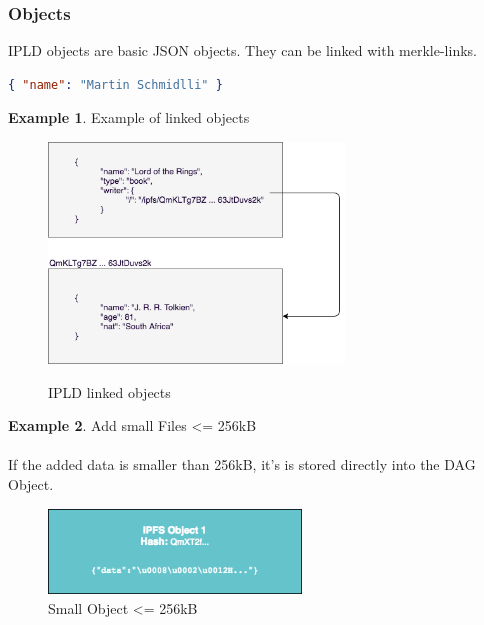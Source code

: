 \documentclass[a4paper,11pt, oneside]{report}
\theoremstyle{definition}
\newtheorem{exmp}{Example}[subsection]
\begin{document}
\subsubsection{Objects}
IPLD objects are basic JSON objects. They can be linked with merkle-links.
\begin{lstlisting}[language=json]
{ "name": "Martin Schmidlli" }
\end{lstlisting}

\begin{exmp} Example of linked objects
\begin{figure}[H]
\centering
\includegraphics[width=0.7\textwidth]{img/ipld-example.png}\\[0.2cm]
\caption[IPLD linked objects]{IPLD linked objects}
\end{figure}
\end{exmp}

\newpage
\begin{exmp}{Add small Files <= 256kB}\\ \\ 
If the added data is smaller than 256kB, it's is stored directly into the DAG Object.
\begin{figure}[H]
\centering
\includegraphics[width=0.6\textwidth]{img/ipfs-fileblocks-small.png}
\caption[Small Object]{Small Object <= 256kB}
\end{figure}
\end{exmp}
\end{document}
